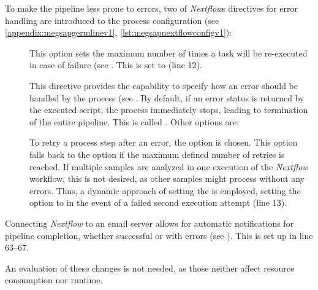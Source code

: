 To make the pipeline less prone to errors, two of \textit{Nextflow}s directives for error handling are introduced to the process configuration (see \cref{appendix:megsapgermlinev1}, \cref{lst:megsapnextflowconfigv1}):
\begin{description}
    \item[] This option sets the maximum number of times a task will be re-executed in case of failure (see \autocite[Directives/maxRetries]{Seqeralabs2022f}. This is set to  (line \num{12}).
    \item[] This directive provides the capability to specify how an error should be handled by the process (see \autocite[Directives/errorStrategy]{Seqeralabs2022f}. By default, if an error status is returned by the executed script, the process immediately stops, leading to termination of the entire pipeline. This  is called . Other options are:
    To retry a process step after an error, the  option is chosen. This option falls back to the  option if the maximum defined number of retries is reached. If multiple samples are analyzed in one execution of the \textit{Nextflow} workflow, this is not desired, as other samples might process without any errors. Thus, a dynamic approach of setting the  is employed, setting the option to  in the event of a failed second execution attempt (line \num{13}).
\end{description}

Connecting \textit{Nextflow} to an email server allows for automatic notifications for pipeline completion, whether successful or with errors (see \autocite[Scope mail]{SeqeraLabs2022e}). This is set up in line \numrange{63}{67}.

An evaluation of these changes is not needed, as those neither affect resource consumption nor runtime.